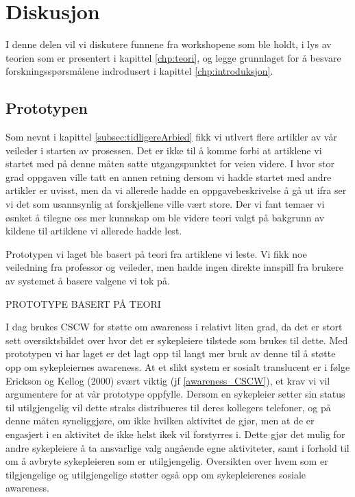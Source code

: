 \chapter{Diskusjon}
\label{chp:diskusjon}
I denne delen vil vi diskutere funnene fra workshopene som ble holdt, i lys av teorien som er presentert i kapittel \ref{chp:teori}, og legge grunnlaget for å besvare forskningsspørsmålene indrodusert i kapittel \ref{chp:introduksjon}.

\section{Prototypen}
\label{protoDisk}
Som nevnt i kapittel \ref{subsec:tidligereArbied} fikk vi utlvert flere artikler av vår veileder i starten av prosessen. Det er ikke til å komme forbi at artiklene vi startet med på denne måten satte utgangspunktet for veien videre. I hvor stor grad oppgaven ville tatt en annen retning dersom vi hadde startet med andre artikler er uvisst, men da vi allerede hadde en oppgavebeskrivelse å gå ut ifra ser vi det som usannsynlig at forskjellene ville vært store.
Der vi fant temaer vi øsnket å tilegne oss mer kunnskap om ble videre teori valgt på bakgrunn av kildene til artiklene vi allerede hadde lest. 

\noindent
Prototypen vi laget ble basert på teori fra artiklene vi leste. Vi fikk noe veiledning fra professor og veileder, men hadde ingen direkte innspill fra brukere av systemet å basere valgene vi tok på. 

PROTOTYPE BASERT PÅ TEORI

\noindent
I dag brukes CSCW for støtte om awareness i relativt liten grad, da det er stort sett oversiktsbildet over hvor det er sykepleiere tilstede som brukes til dette. Med prototypen vi har laget er det lagt opp til langt mer bruk av denne til å støtte opp om sykepleiernes awareness. At et slikt system er sosialt translucent er i følge Erickson og Kellog (2000) svært viktig (jf \ref{awareness_CSCW}), et krav vi vil argumentere for at vår prototype oppfylle. Dersom en sykepleier setter sin status til utilgjengelig vil dette straks distribueres til deres kollegers telefoner, og på denne måten syneliggjøre, om ikke hvilken aktivitet de gjør, men at de er engasjert i en aktivitet de ikke helst ikek vil forstyrres i. Dette gjør det mulig for andre sykepleiere å ta ansvarlige valg angående egne aktiviteter, samt i forhold til om å avbryte sykepleieren som er utilgjengelig. Oversikten over hvem som er tilgjengelige og utilgjengelige støtter også opp om sykepleierenes sosiale awareness.

